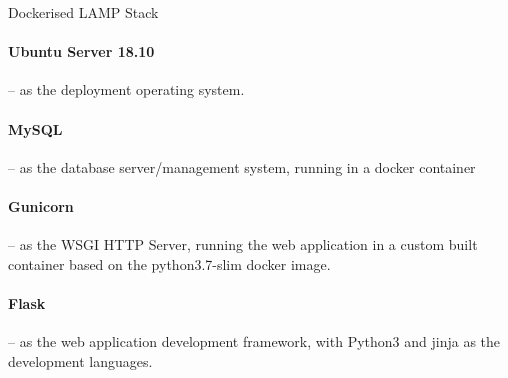\begin{displaytable}{\label{display:lamp_stack}}{Dockerised LAMP Stack}
  \paragraph{\href{http://releases.ubuntu.com/18.10/ubuntu-18.10-live-server-amd64.iso}{\faExternalLinkSquare} Ubuntu Server 18.10}
  \hspace{-0.6em}-- as the deployment operating system.
  \paragraph{\href{https://hub.docker.com/\_/mysql}{\faExternalLinkSquare} MySQL}
  \hspace{-0.6em}-- as the database server/management system, running in a docker container 
  \paragraph{\href{https://pypi.org/project/gunicorn/}{\faExternalLinkSquare} Gunicorn}
  \hspace{-0.6em}-- as the WSGI HTTP Server, running the web application in a custom built container based on the python3.7-slim docker image.
  \paragraph{\href{https://pypi.org/project/Flask/1.0.2/}{\faExternalLinkSquare} Flask}
  \hspace{-0.6em}-- as the web application development framework, with Python3 and jinja as the development languages.
  \vspace{1em}
\end{displaytable}

